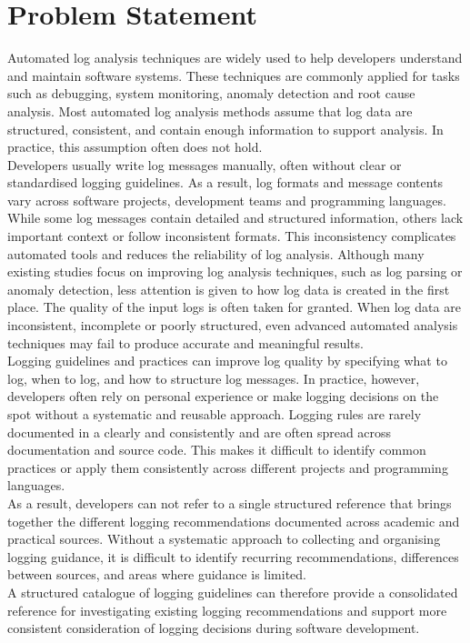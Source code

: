 \section{Problem Statement}
Automated log analysis techniques are widely used to help developers understand and maintain
software systems. These techniques are commonly applied for tasks such as debugging, system
monitoring, anomaly detection and root cause analysis. Most automated log analysis methods 
assume that log data are structured, consistent, and contain enough information to support analysis.
In practice, this assumption often does not hold.
\\
Developers usually write log messages manually, often without clear or standardised
logging guidelines. As a result, log formats and message contents vary across software projects,
development teams and programming languages. While some log messages contain detailed and
structured information, others lack important context or follow inconsistent formats. This inconsistency
complicates automated tools and reduces the reliability of log analysis.
Although many existing studies focus on improving log analysis techniques, such as log parsing
or anomaly detection, less attention is given to how log data is created in the first place. The
quality of the input logs is often taken for granted. When log data are inconsistent, incomplete or
poorly structured, even advanced automated analysis techniques may fail to produce accurate and
meaningful results.
\\
Logging guidelines and practices can improve log quality by specifying
what to log, when to log, and how to structure log messages. In
practice, however, developers often rely on personal experience or make logging decisions on the
spot without a systematic and reusable approach. Logging rules are rarely documented in a clearly and
consistently and are often spread across documentation and source code. This makes it difficult to
identify common practices or apply them consistently across different projects and programming
languages.
\\
As a result, developers can not refer to a single structured reference that brings
together the different logging recommendations documented across academic and
practical sources. Without a systematic approach to collecting and organising
logging guidance, it is difficult to identify recurring recommendations, differences
between sources, and areas where guidance is limited.
\\
A structured catalogue of logging guidelines can therefore provide a consolidated
reference for investigating existing logging recommendations and support more
consistent consideration of logging decisions during software development.


